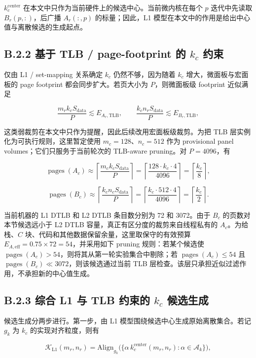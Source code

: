 \documentclass[a4paper,11pt,oneside]{article}
\begin{document}
$k_c^{\text{center}}$ 在本文中只作为当前硬件上的候选中心。当前微内核在每个 $p$ 迭代中先读取 $B_r(p,:)$，后广播 $A_r(:,p)$ 的标量；因此，L1 模型在本文中的作用是给出中心值与离散候选的生成起点。

\subsection*{B.2.2 基于 TLB / page-footprint 的 $k_c$ 约束}

仅由 L1 / set-mapping 关系确定 $k_c$ 仍然不够，因为随着 $k_c$ 增大，微面板与宏面板的 page footprint 都会同步扩大。若页大小为 $P$，则微面板级 footprint 近似满足

$$
\frac{m_r k_c S_{\text{data}}}{P} \lesssim E_{A_r,\mathrm{TLB}},
\qquad
\frac{k_c n_r S_{\text{data}}}{P} \lesssim E_{B_r,\mathrm{TLB}},
$$

这类弱裁剪在本文中只作为提醒，因此后续改用宏面板级裁剪。为把 TLB 层实例化为可执行规则，这里暂定使用 $m_c=128$、$n_c=512$ 作为 provisional panel volumes；它们只服务于当前轮次的 TLB-aware pruning。对 $P=4096$，有

$$
\operatorname{pages}(A_c) \approx \left\lceil \frac{m_c k_c S_{\text{data}}}{P} \right\rceil
= \left\lceil \frac{128 \cdot k_c \cdot 4}{4096} \right\rceil
= \left\lceil \frac{k_c}{8} \right\rceil,
$$

$$
\operatorname{pages}(B_c) \approx \left\lceil \frac{k_c n_c S_{\text{data}}}{P} \right\rceil
= \left\lceil \frac{k_c \cdot 512 \cdot 4}{4096} \right\rceil
= \left\lceil \frac{k_c}{2} \right\rceil.
$$

当前机器的 L1 DTLB 和 L2 DTLB 条目数分别为 72 和 3072。由于 $B_c$ 的页数对本节候选远小于 L2 DTLB 容量，真正有区分度的裁剪来自线程私有的 $A_c$。为给栈、$C$ 块、代码和其他数据保留余量，这里取保守的有效预算 $E_{A,\mathrm{eff}}=0.75 \times 72 = 54$，并采用如下 pruning 规则：若某个候选使 $\operatorname{pages}(A_c) > 54$，则将其从第一轮实验集合中剔除；若 $\operatorname{pages}(A_c) \le 54$ 且 $\operatorname{pages}(B_c) \ll 3072$，则该候选通过当前 TLB 层检查。该层只承担近似过滤作用，不承担新的中心值生成。

\subsection*{B.2.3 综合 L1 与 TLB 约束的 $k_c$ 候选生成}

候选生成分两步进行。第一步，由 L1 模型围绕候选中心生成原始离散集合。若记 $g_k$ 为 $k_c$ 的实现对齐粒度，则有

$$
\mathcal{K}_{\mathrm{L1}}(m_r,n_r) = \mathrm{Align}_{g_k}\bigl(\{ \alpha\, k_c^{\text{center}}(m_r,n_r) : \alpha \in \mathcal{A}_k \}\bigr),
$$
\end{document}
